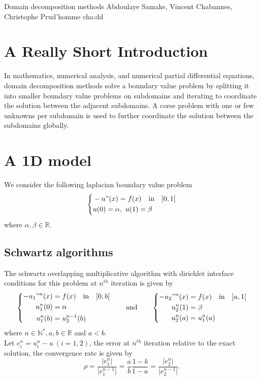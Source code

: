             {Domain decomposition methods}
            {Abdoulaye Samake, Vincent Chabannes, Christophe Prud'homme}
            {cha:dd}

\section{A Really Short Introduction}
\label{sec:really-short-intr}
In mathematics, numerical analysis, and numerical partial differential equations, domain decomposition methods solve
a boundary value problem by splitting it into smaller boundary value problems on subdomains and iterating to coordinate
the solution between the adjacent subdomains. A corse problem with one or few unknowns per subdomain is used to further
coordinate the solution between the subdomains globally.
\section{A 1D model}
\label{sec:1d-mode}
We consider the following laplacian boundary value problem
\begin{equation}
  \left \{
    \begin{aligned}
      & -u"(x) = f(x) \quad \text{in} \quad  ]0,1[ \\
      & u(0) =\alpha, ~ u(1) = \beta
    \end{aligned}
  \right.
\label{eq:30}
\end{equation}
where $\alpha, \beta \in \mathbb R.$
\subsection{Schwartz algorithms}
\label{sec:schwartz-algorithms}
The schwartz overlapping multiplicative algorithm with dirichlet interface conditions for this problem at $n^{th}$ iteration is given by
\begin{equation}
  \label{eq:31}
  \left \{
    \begin{aligned}
      -u_1"^n(x) & =  f(x) \quad  \text{in}  \quad  ]0,b[  \\
       u_1^n(0) & =  \alpha \\
       u_1^n(b)  & = u_2^{n-1}(b)
    \end{aligned}
  \right.
\qquad \text{and} \qquad
  \left \{
    \begin{aligned}
      -u_2"^n(x) & =  f(x) \quad  \text{in}  \quad  ]a,1[  \\
      u_2^n(1) & =  \beta \\
      u_2^n(a)  & = u_1^n(a)
    \end{aligned}
  \right.
\end{equation}
where $ n \in \mathbb N^*, a, b \in \mathbb R $ and $a < b$. \\
Let $e_i^n = u_i^n-u~(i=1,2)$, the error at $n^{th}$ iteration relative to the exact solution, the convergence rate is given by
\begin{equation}
  \rho = \frac{\vert e_1^n  \vert}{\vert e_1^{n-1}  \vert} = \frac{a}{b}\frac{1-b}{1-a} = \frac{\vert e_2^n  \vert}{\vert e_2^{n-1}  \vert} .
  \label{eq:32}
\end{equation}

